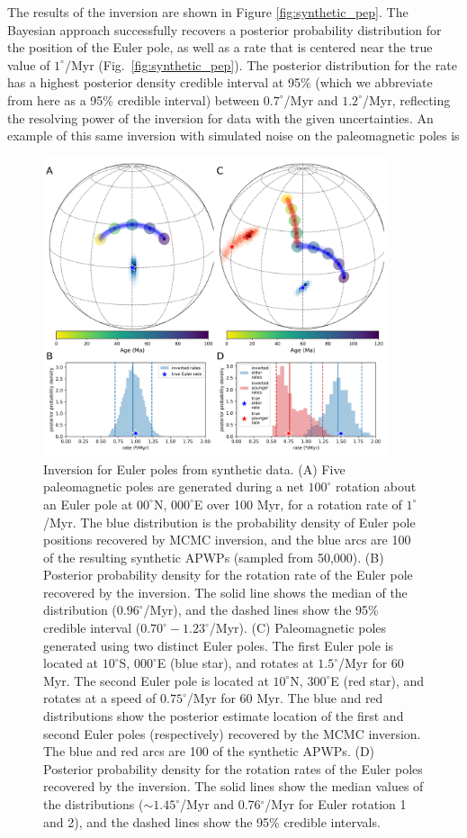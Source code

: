\documentclass[11pt,letterpaper]{article}
\begin{document}
The results of the inversion are shown in Figure \ref{fig:synthetic_pep}. The Bayesian approach successfully recovers a posterior probability distribution for the position of the Euler pole, as well as a rate that is centered near the true value of $1^\circ$/Myr (Fig.~\ref{fig:synthetic_pep}). The posterior distribution for the rate has a highest posterior density credible interval at 95\% (which we abbreviate from here as a 95\% credible interval) between $0.7^\circ$/Myr and $1.2^\circ$/Myr, reflecting the resolving power of the inversion for data with the given uncertainties. An example of this same inversion with simulated noise on the paleomagnetic poles is 

\begin{figure}
\centering
\includegraphics[width=0.9\textwidth]{fig_synthetic_pep.png}
\caption{Inversion for Euler poles from synthetic data. (A) Five paleomagnetic poles are generated during a net $100^\circ$ rotation about an Euler pole at $00^\circ$N, $000^\circ$E over 100 Myr, for a rotation rate of $1^\circ$/Myr. The blue distribution is the probability density of Euler pole positions recovered by MCMC inversion, and the blue arcs are 100 of the resulting synthetic APWPs (sampled from 50,000). (B) Posterior probability density for the rotation rate of the Euler pole recovered by the inversion. The solid line shows the median of the distribution ($0.96^\circ$/Myr), and the dashed lines show the 95\% credible interval ($0.70^\circ-1.23^\circ$/Myr). (C) Paleomagnetic poles generated using two distinct Euler poles. The first Euler pole is located at $10^\circ$S, $000^\circ$E (blue star), and rotates at $1.5^\circ$/Myr for 60 Myr. The second Euler pole is located at $10^\circ$N, $300^\circ$E (red star), and rotates at a speed of $0.75^\circ$/Myr for 60 Myr. The blue and red distributions show the posterior estimate location of the first and second Euler poles (respectively) recovered by the MCMC inversion. The blue and red arcs are 100 of the synthetic APWPs. (D) Posterior probability density for the rotation rates of the Euler poles recovered by the inversion. The solid lines show the median values of the distributions ($\sim 1.45^\circ$/Myr and 0.76$^\circ$/Myr for Euler rotation 1 and 2), and the dashed lines show the 95\% credible intervals.}

\end{figure}
\end{document}
